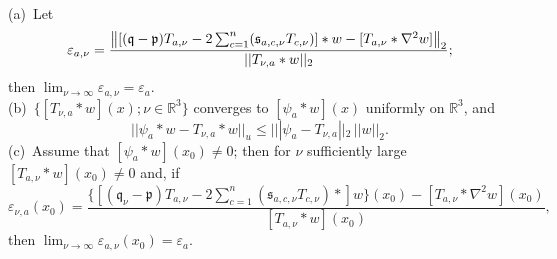 \documentclass[10pt,a4paper]{amsart}
\newcommand{\IR}{\text{${\mathbb{R}}$}}
\newcommand{\p}{\mathfrak{p}}
\newcommand{\q}{\mathfrak{q}}
\newcommand{\s}{\mathfrak{s}}
\begin{document}
\begin{thm}\label{thm4}\hspace{1in}\\
(a)\ Let
\begin{equation} \label{eq11}
 \varepsilon_{a,\nu}= 
 \frac{\big{\Vert} [(\q -\p )T_{a,\nu } -2\sum_{c=1}^n(\s_{a,c,\nu} T_{c,\nu}) ] \ast w -  [ T_{a, \nu}\ast \nabla^2w ] \big{\Vert}_2}
 {||T_{\nu,a} \ast w ||_2};
 \end{equation}
then $\lim_{\nu\rightarrow \infty}\varepsilon_{a,\nu}=\varepsilon_a$.\\
(b)\ $\{[T_{\nu,a}\ast w](x); \nu \in \IR^3\}$ converges to $[\psi_a\ast w](x)$ uniformly on $\IR^3$, and
\begin{equation} \label{eq12}
|| \psi_a\ast w-T_{\nu,a}\ast w||_u \le |||\psi_a-T_{\nu,a}||_2\,||w||_2.
\end{equation}
(c)\ Assume that $[\psi_a\ast w](x_0)\ne 0$; then for $\nu$ sufficiently large $[T_{a,\nu}\ast w](x_0) \ne 0$ and, if
\begin{equation} \label{eq13}
\varepsilon_{\nu,a}(x_0)= \frac{\{[(\q _{\nu}-\p )T_{a,\nu } -2\sum_{c=1}^n(\s_{a,c,\nu} T_{c,\nu})\ast] w \}(x_0)-  [ T_{a, \nu}\ast \nabla^2w ] (x_0)}{[T_{a,\nu}\ast w](x_0)},
\end{equation}
then $\lim_{\nu \rightarrow \infty}\varepsilon_{a,\nu}(x_0)= \varepsilon_a$.
\end{thm}
\end{document}
